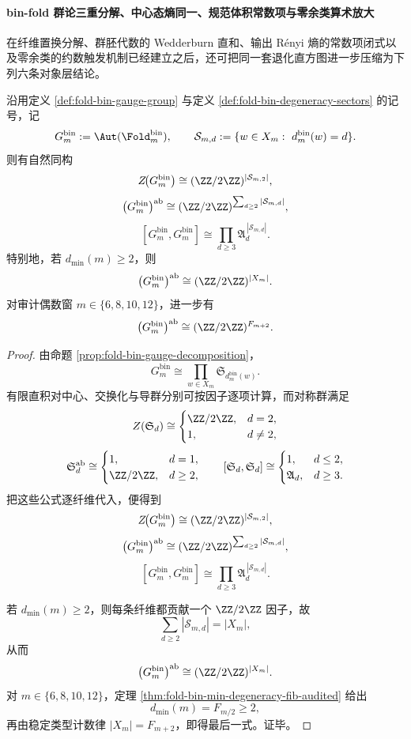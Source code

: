 \paragraph{bin-fold 群论三重分解、中心态熵同一、规范体积常数项与零余类算术放大}
在纤维置换分解、群胚代数的 Wedderburn 直和、输出 Rényi 熵的常数项闭式以及零余类的约数触发机制已经建立之后，还可把同一套退化直方图进一步压缩为下列六条对象层结论。

\begin{theorem}\label{thm:xi-foldbin-gauge-group-center-abel-derived-triple-decomposition}
沿用定义 \ref{def:fold-bin-gauge-group} 与定义 \ref{def:fold-bin-degeneracy-sectors} 的记号，记
\[
G_m^{\mathrm{bin}}:=\Aut(\Fold_m^{\mathrm{bin}}),
\qquad
\mathcal S_{m,d}:=\{w\in X_m:\ d_m^{\mathrm{bin}}(w)=d\}.
\]
则有自然同构
\[
Z\!\bigl(G_m^{\mathrm{bin}}\bigr)\cong (\ZZ/2\ZZ)^{|\mathcal S_{m,2}|},
\]
\[
\bigl(G_m^{\mathrm{bin}}\bigr)^{\mathrm{ab}}
\cong
(\ZZ/2\ZZ)^{\sum_{d\ge 2}|\mathcal S_{m,d}|},
\]
\[
[G_m^{\mathrm{bin}},G_m^{\mathrm{bin}}]
\cong
\prod_{d\ge 3}\mathfrak A_d^{\,|\mathcal S_{m,d}|}.
\]
特别地，若 \(d_{\min}(m)\ge 2\)，则
\[
\bigl(G_m^{\mathrm{bin}}\bigr)^{\mathrm{ab}}
\cong
(\ZZ/2\ZZ)^{|X_m|}.
\]
对审计偶数窗
\(
m\in\{6,8,10,12\}
\)，进一步有
\[
\bigl(G_m^{\mathrm{bin}}\bigr)^{\mathrm{ab}}
\cong
(\ZZ/2\ZZ)^{F_{m+2}}.
\]
\end{theorem}
\begin{proof}
由命题 \ref{prop:fold-bin-gauge-decomposition}，
\[
G_m^{\mathrm{bin}}
\cong
\prod_{w\in X_m}\mathfrak S_{d_m^{\mathrm{bin}}(w)}.
\]
有限直积对中心、交换化与导群分别可按因子逐项计算，而对称群满足
\[
Z(\mathfrak S_d)\cong
\begin{cases}
\ZZ/2\ZZ,& d=2,\\
1,& d\neq 2,
\end{cases}
\]
\[
\mathfrak S_d^{\mathrm{ab}}\cong
\begin{cases}
1,& d=1,\\
\ZZ/2\ZZ,& d\ge 2,
\end{cases}
\qquad
[\mathfrak S_d,\mathfrak S_d]\cong
\begin{cases}
1,& d\le 2,\\
\mathfrak A_d,& d\ge 3.
\end{cases}
\]
把这些公式逐纤维代入，便得到
\[
Z\!\bigl(G_m^{\mathrm{bin}}\bigr)\cong (\ZZ/2\ZZ)^{|\mathcal S_{m,2}|},
\]
\[
\bigl(G_m^{\mathrm{bin}}\bigr)^{\mathrm{ab}}
\cong
(\ZZ/2\ZZ)^{\sum_{d\ge 2}|\mathcal S_{m,d}|},
\]
\[
[G_m^{\mathrm{bin}},G_m^{\mathrm{bin}}]
\cong
\prod_{d\ge 3}\mathfrak A_d^{\,|\mathcal S_{m,d}|}.
\]

若 \(d_{\min}(m)\ge 2\)，则每条纤维都贡献一个 \(\ZZ/2\ZZ\) 因子，故
\[
\sum_{d\ge 2}|\mathcal S_{m,d}|=|X_m|,
\]
从而
\[
\bigl(G_m^{\mathrm{bin}}\bigr)^{\mathrm{ab}}\cong (\ZZ/2\ZZ)^{|X_m|}.
\]
对 \(m\in\{6,8,10,12\}\)，定理 \ref{thm:fold-bin-min-degeneracy-fib-audited} 给出
\[
d_{\min}(m)=F_{m/2}\ge 2,
\]
再由稳定类型计数律 \(|X_m|=F_{m+2}\)，即得最后一式。证毕。
\end{proof}

